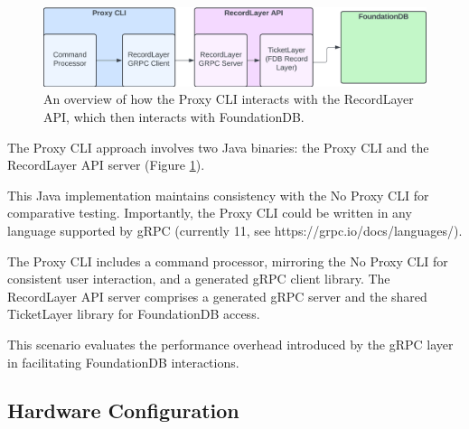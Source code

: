 \documentclass[sigconf]{acmart}
\begin{document}
\begin{figure}[h]
  \centering
  \includegraphics[width=\linewidth]{diag_code_pc.png}
  \caption{An overview of how the Proxy CLI interacts with the RecordLayer API, which then interacts with FoundationDB.}
  \label{fig:diag_code_pc}
\end{figure}

The Proxy CLI approach involves two Java binaries: the Proxy CLI and the RecordLayer API server (Figure \ref{fig:diag_code_pc}).

This Java implementation maintains consistency with the No Proxy CLI for comparative testing.
Importantly, the Proxy CLI could be written in any language supported by gRPC (currently 11, see https://grpc.io/docs/languages/).

The Proxy CLI includes a command processor, mirroring the No Proxy CLI for consistent user interaction, and a generated gRPC client library. The RecordLayer API server comprises a generated gRPC server and the shared TicketLayer library for FoundationDB access.

This scenario evaluates the performance overhead introduced by the gRPC layer in facilitating FoundationDB interactions.

\subsection{Hardware Configuration}
\end{document}
